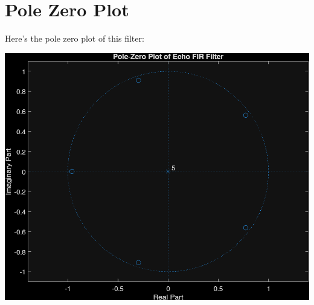 \documentclass[11pt]{article}
\begin{document}
\section{Pole Zero Plot}

Here's the pole zero plot of this filter:

\includegraphics[scale=0.4]{untitled1.png}
\end{document}

